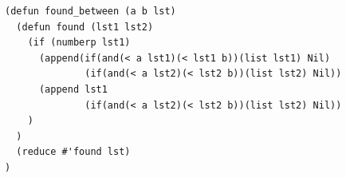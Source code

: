 \documentclass[a4paper,14pt]{extreport} %
\begin{document}
\begin{enumerate}
\begin{lstlisting}
(defun found_between (a b lst)
  (defun found (lst1 lst2)
    (if (numberp lst1)
      (append(if(and(< a lst1)(< lst1 b))(list lst1) Nil)
              (if(and(< a lst2)(< lst2 b))(list lst2) Nil))
      (append lst1
              (if(and(< a lst2)(< lst2 b))(list lst2) Nil))
    )
  )
  (reduce #'found lst)
)
\end{lstlisting}

\end{enumerate}
\end{document}
